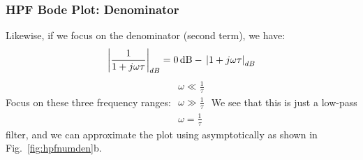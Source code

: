 \subsubsection{HPF Bode Plot: Denominator}
Likewise, if we focus on the denominator (second term), we have:
    \begin{equation} 
        {\left| {\frac{1}{{1 + j\omega \tau }}} \right|_{dB}} = 0\,{\rm{dB}} - \,{\left| {1 + j\omega \tau } \right|_{dB}}
    \end{equation}
Focus on these three frequency ranges:
    $\begin{array}{l}
        \omega  \ll \frac{1}{\tau }\\
        \omega  \gg \frac{1}{\tau }\\
        \omega  = \frac{1}{\tau }
    \end{array}$
We see that this is just a low-pass filter, and we can approximate the plot using asymptotically as shown in Fig.~\ref{fig:hpfnumden}b. 
